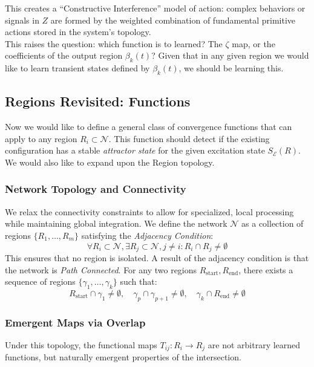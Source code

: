 \documentclass{article}
\begin{document}
This creates a ``Constructive Interference'' model of action: complex behaviors or signals in $Z$ are formed by the weighted combination of fundamental primitive actions stored in the system's topology. \\

This raises the question: which function is to learned? The $\zeta$ map, or the coefficients of the output region $\beta_k(t)$? Given that in any given region we would like to learn transient states defined by $\beta_k(t)$, we should be learning this.


\subsection{Regions Revisited: Functions}
Now we would like to define a general class of convergence functions that can apply to any region $R_i \subset \mathcal{N}$. This function should detect if the existing configuration has a stable \textit{attractor state} for the given excitation state $S_\mathcal{E} (R)$. \\

We would also like to expand upon the Region topology.

\subsubsection{Network Topology and Connectivity}
We relax the connectivity constraints to allow for specialized, local processing while maintaining global integration. We define the network $\mathcal{N}$ as a collection of regions $\{R_1, \dots, R_m\}$ satisfying the \textit{Adjacency Condition}:
\begin{equation}
    \forall R_i \subset \mathcal{N}, \exists R_j \subset \mathcal{N}, j \ne i : R_i \cap R_j \ne \emptyset
\end{equation}
This ensures that no region is isolated. A result of the adjacency condition is that the network is \textit{Path Connected}. For any two regions $R_{\text{start}}, R_{\text{end}}$, there exists a sequence of regions $\{ \gamma_1, \dots, \gamma_k \}$ such that:
\begin{equation}
    R_{\text{start}} \cap \gamma_1 \ne \emptyset, \quad \gamma_p \cap \gamma_{p+1} \ne \emptyset, \quad \gamma_k \cap R_{\text{end}} \ne \emptyset
\end{equation}

\subsubsection{Emergent Maps via Overlap}
Under this topology, the functional maps $T_{ij}: R_i \to R_j$ are not arbitrary learned functions, but naturally emergent properties of the intersection.
\end{document}
